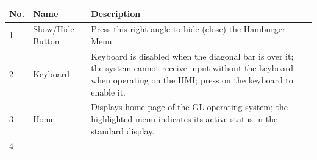 \begin{longtable}[]{@{}lll@{}}
\toprule
\begin{minipage}[b]{0.04\columnwidth}\raggedright
No.\strut
\end{minipage} & \begin{minipage}[b]{0.23\columnwidth}\raggedright
Name\strut
\end{minipage} & \begin{minipage}[b]{0.65\columnwidth}\raggedright
Description\strut
\end{minipage}\tabularnewline
\midrule
\endhead
\begin{minipage}[t]{0.04\columnwidth}\raggedright
1\strut
\end{minipage} & \begin{minipage}[t]{0.23\columnwidth}\raggedright
Show/Hide Button\strut
\end{minipage} & \begin{minipage}[t]{0.65\columnwidth}\raggedright
Press this right angle to hide (close) the Hamburger Menu\strut
\end{minipage}\tabularnewline
\begin{minipage}[t]{0.04\columnwidth}\raggedright
2\strut
\end{minipage} & \begin{minipage}[t]{0.23\columnwidth}\raggedright
Keyboard\strut
\end{minipage} & \begin{minipage}[t]{0.65\columnwidth}\raggedright
Keyboard is disabled when the diagonal bar is over it; the system cannot
receive input without the keyboard when operating on the HMI; press on
the keyboard to enable it.\strut
\end{minipage}\tabularnewline
\begin{minipage}[t]{0.04\columnwidth}\raggedright
3\strut
\end{minipage} & \begin{minipage}[t]{0.23\columnwidth}\raggedright
Home\strut
\end{minipage} & \begin{minipage}[t]{0.65\columnwidth}\raggedright
Displays home page of the GL operating system; the highlighted menu
indicates its active status in the standard display.\strut
\end{minipage}\tabularnewline
\begin{minipage}[t]{0.04\columnwidth}\raggedright
4\strut
\end{minipage} & \begin{minipage}[t]{0.23\columnwidth}\raggedright

\end{minipage}
\end{longtable}
